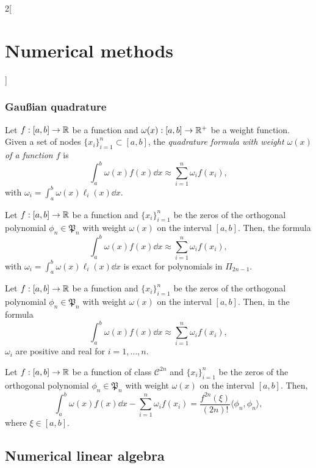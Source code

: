\documentclass[../../../main.tex]{subfiles}
\begin{document}
\begin{multicols}{2}[\section{Numerical methods}]
\subsubsection*{Gau\ss ian quadrature}
\begin{definition}
    Let $f:[a,b]\rightarrow\mathbb{R}$ be a function and $\omega(x):[a,b]\rightarrow\mathbb{R}^+$ be a weight function. Given a set of nodes $\{x_i\}_{i=1}^n\subset[a,b]$, the \textit{quadrature formula with weight $\omega(x)$ of a function $f$} is $$\int_a^b\omega(x)f(x)\dd x\approx\sum_{i=1}^n\omega_if(x_i),$$ with $\omega_i=\int_a^b\omega(x)\ell_i(x)\dd x$.
\end{definition}
\begin{lemma}
    Let $f:[a,b]\rightarrow\mathbb{R}$ be a function and $\{x_i\}_{i=1}^n$ be the zeros of the orthogonal polynomial $\phi_n\in\mathfrak{P}_n$ with weight $\omega(x)$ on the interval $[a,b]$. Then, the formula $$\int_a^b\omega(x)f(x)\dd x\approx\sum_{i=1}^n\omega_if(x_i),$$ with $\omega_i=\int_a^b\omega(x)\ell_i(x)\dd x$ is exact for polynomials in $\Pi_{2n-1}$.
\end{lemma}
\begin{prop}
    Let $f:[a,b]\rightarrow\mathbb{R}$ be a function and $\{x_i\}_{i=1}^n$ be the zeros of the orthogonal polynomial $\phi_n\in\mathfrak{P}_n$ with weight $\omega(x)$ on the interval $[a,b]$. Then, in the formula $$\int_a^b\omega(x)f(x)\dd x\approx\sum_{i=1}^n\omega_if(x_i),$$ $\omega_i$ are positive and real for $i=1,\ldots,n$.
\end{prop}
\begin{theorem}
    Let $f:[a,b]\rightarrow\mathbb{R}$ be a function of class $\mathcal{C}^{2n}$ and $\{x_i\}_{i=1}^n$ be the zeros of the orthogonal polynomial $\phi_n\in\mathfrak{P}_n$ with weight $\omega(x)$ on the interval $[a,b]$. Then, $$\int_a^b\omega(x)f(x)\dd x-\sum_{i=1}^n\omega_if(x_i)=\frac{f^{2n}(\xi)}{(2n)!}\langle\phi_n,\phi_n\rangle,$$ where $\xi\in[a,b]$. 
\end{theorem}
\subsection{Numerical linear algebra}

\end{multicols}
\end{document}
